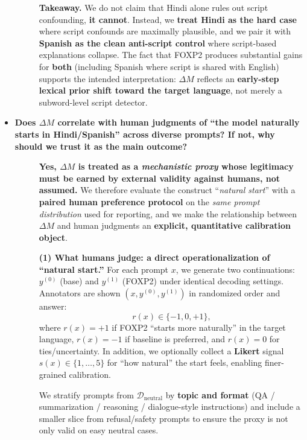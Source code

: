 \begin{itemize}[leftmargin=1.5em]
\begin{description}
\vspace{8pt}
\textbf{Takeaway.} We do not claim that Hindi alone rules out script confounding, \textbf{it cannot}. Instead, we \textbf{treat Hindi as the hard case} where script confounds are maximally plausible, and we pair it with \textbf{Spanish as the clean anti-script control} where script-based explanations collapse. The fact that FOXP2 produces substantial gains for \textbf{both} (including Spanish where script is shared with English) supports the intended interpretation: $\Delta M$ reflects an \textbf{early-step lexical prior shift toward the target language}, not merely a subword-level script detector.
\end{description}


\item[\ding{93}] \textbf{Does $\Delta M$ correlate with human judgments of “the model naturally starts in Hindi/Spanish” across diverse prompts? If not, why should we trust it as the main outcome?}
\begin{description}
\item[] \textbf{Yes, $\Delta M$ is treated as a \emph{mechanistic proxy} whose legitimacy must be earned by \textbf{external validity} against humans, not assumed.}
We therefore evaluate the construct “\emph{natural start}” with a \textbf{paired human preference protocol} on the \emph{same prompt distribution} used for reporting, and we make the relationship between $\Delta M$ and human judgments an \textbf{explicit, quantitative calibration object}.

\vspace{4pt}
\textbf{(1) What humans judge: a direct operationalization of “natural start.”}
For each prompt $x$, we generate two continuations: $y^{(0)}$ (base) and $y^{(1)}$ (FOXP2) under identical decoding settings. Annotators are shown $(x, y^{(0)}, y^{(1)})$ in randomized order and answer:
\[
r(x)\in\{-1,0,+1\},
\]
where $r(x)=+1$ if FOXP2 “starts more naturally” in the target language, $r(x)=-1$ if baseline is preferred, and $r(x)=0$ for ties/uncertainty. In addition, we optionally collect a \textbf{Likert} signal $s(x)\in\{1,\dots,5\}$ for “how natural” the start feels, enabling finer-grained calibration.

We stratify prompts from $\mathcal{D}_{\mathrm{neutral}}$ by \textbf{topic and format} (QA / summarization / reasoning / dialogue-style instructions) and include a smaller slice from refusal/safety prompts to ensure the proxy is not only valid on easy neutral cases.


\end{description}
\end{itemize}
